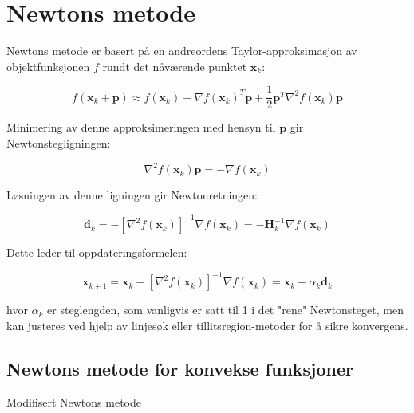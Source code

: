 \section{Newtons metode}
\label{sec:newtons_method}
Newtons metode er basert på en andreordens Taylor-approksimasjon av objektfunksjonen \(f\) rundt det nåværende punktet \(\symbf{x}_k\):

\[
	f(\symbf{x}_k + \symbf{p}) \approx f(\symbf{x}_k) + \nabla f(\symbf{x}_k)^T \symbf{p} + \frac{1}{2}\symbf{p}^T \nabla^2 f(\symbf{x}_k) \symbf{p}
\]

Minimering av denne approksimeringen med hensyn til \(\symbf{p}\) gir Newtonstegligningen:

\[
	\nabla^2 f(\symbf{x}_k) \symbf{p} = -\nabla f(\symbf{x}_k)
\]

Løsningen av denne ligningen gir Newtonretningen:

\[
	\symbf{d}_k = -[\nabla^2 f(\symbf{x}_k)]^{-1} \nabla f(\symbf{x}_k) = -\symbf{H}_k^{-1} \nabla f(\symbf{x}_k)
\]

Dette leder til oppdateringsformelen:

\[
	\mathbf{x}_{k+1} = \mathbf{x}_k - [\nabla^2 f(\mathbf{x}_k)]^{-1} \nabla f(\mathbf{x}_k) = \mathbf{x}_k + \alpha_k \mathbf{d}_k
\]

hvor \(\alpha_k\) er steglengden, som vanligvis er satt til 1 i det "rene" Newtonsteget, men kan justeres ved hjelp av linjesøk eller tillitsregion-metoder for å sikre konvergens.

\subsection{Newtons metode for konvekse funksjoner}
\label{subsec:newton_convex}

\begin{algorithm}[H]
	\SetAlgoLined
	\caption{Modifisert Newtons metode}
	\label{alg:modified_newton}
\end{algorithm}

